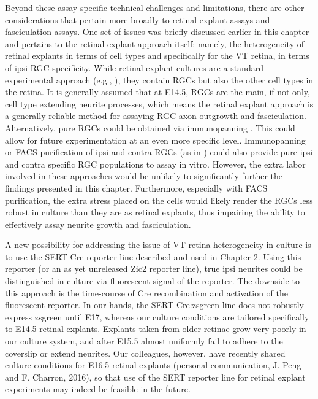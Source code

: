 Beyond these assay-specific technical challenges and limitations, there are other considerations that pertain more broadly to retinal explant assays and fasciculation assays.
One set of issues was briefly discussed earlier in this chapter and pertains to the retinal explant approach itself: namely, the heterogeneity of retinal explants in terms of cell types and specifically for the VT retina, in terms of ipsi RGC specificity.
While retinal explant cultures are a standard experimental approach (e.g., ), they contain RGCs but also the other cell types in the retina.
It is generally assumed that at E14.5, RGCs are the main, if not only, cell type extending neurite processes, which means the retinal explant approach is a generally reliable method for assaying RGC axon outgrowth and fasciculation.
Alternatively, pure RGCs could be obtained via immunopanning \cite{barres1988immunological}.
This could allow for future experimentation at an even more specific level.
Immunopanning or FACS purification of ipsi and contra RGCs (as in ) could also provide pure ipsi and contra specific RGC populations to assay in vitro.
However, the extra labor involved in these approaches would be unlikely to significantly further the findings presented in this chapter.
Furthermore, especially with FACS purification, the extra stress placed on the cells would likely render the RGCs less robust in culture than they are as retinal explants, thus impairing the ability to effectively assay neurite growth and fasciculation.

A new possibility for addressing the issue of VT retina heterogeneity in culture is to use the SERT-Cre reporter line described and used in Chapter 2.
Using this reporter (or an as yet unreleased Zic2 reporter line), true ipsi neurites could be distinguished in culture via fluorescent signal of the reporter.
The downside to this approach is the time-course of Cre recombination and activation of the fluorescent reporter.
In our hands, the SERT-Cre:zsgreen line does not robustly express zsgreen until E17, whereas our culture conditions are tailored specifically to E14.5 retinal explants.
Explants taken from older retinae grow very poorly in our culture system, and after E15.5 almost uniformly fail to adhere to the coverslip or extend neurites.
Our colleagues, however, have recently shared culture conditions for E16.5 retinal explants (personal communication, J. Peng and F. Charron, 2016), so that use of the SERT reporter line for retinal explant experiments may indeed be feasible in the future.

